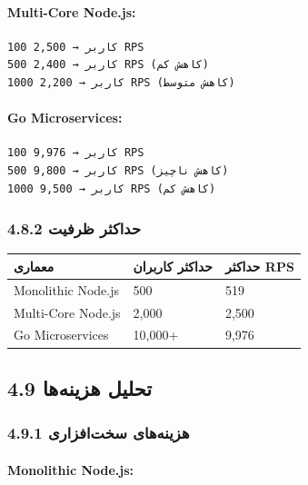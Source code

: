 \documentclass[
]{article}
\newcounter{none} %
\begin{document}
\paragraph{Multi-Core Node.js:}\label{multi-core-node.js}

\begin{verbatim}
100 کاربر → 2,500 RPS
500 کاربر → 2,400 RPS (کاهش کم)
1000 کاربر → 2,200 RPS (کاهش متوسط)
\end{verbatim}

\paragraph{Go Microservices:}\label{go-microservices}

\begin{verbatim}
100 کاربر → 9,976 RPS
500 کاربر → 9,800 RPS (کاهش ناچیز)
1000 کاربر → 9,500 RPS (کاهش کم)
\end{verbatim}

\subsubsection{4.8.2 حداکثر
ظرفیت}\label{ux62dux62fux627ux6a9ux62bux631-ux638ux631ux641ux6ccux62a}

{\def\LTcaptype{none} %
\begin{longtable}[]{@{}lll@{}}
\toprule\noalign{}
معماری & حداکثر کاربران & حداکثر RPS \\
\midrule\noalign{}
\endhead
\bottomrule\noalign{}
\endlastfoot
Monolithic Node.js & 500 & 519 \\
Multi-Core Node.js & 2,000 & 2,500 \\
Go Microservices & 10,000+ & 9,976 \\
\end{longtable}
}

\subsection{4.9 تحلیل
هزینه‌ها}\label{ux62aux62dux644ux6ccux644-ux647ux632ux6ccux646ux647ux647ux627}

\subsubsection{4.9.1 هزینه‌های
سخت‌افزاری}\label{ux647ux632ux6ccux646ux647ux647ux627ux6cc-ux633ux62eux62aux627ux641ux632ux627ux631ux6cc}

\paragraph{Monolithic Node.js:}\label{monolithic-node.js-1}
\end{document}
